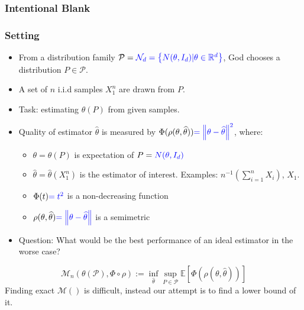 \documentclass[10pt,xcolor={usenames,dvipsnames,table},aspectratio=169]{beamer}
\begin{document}
\begin{frame}
    \frametitle{Intentional Blank}
\end{frame}

\begin{frame}
    \frametitle{Setting}
    \begin{itemize}
        \item From a distribution family $\mathcal{P} = {\color{blue} \mathcal{N}_d = \left\{N(\theta, I_d) | \theta \in \mathbb{R}^{d}\right\}}$, God chooses a distribution $P \in \mathcal{P}$.
        \item A set of $n$ i.i.d samples $X_1^{n}$ are drawn from  $P$.
        \item Task: estimating $\theta(P)$ from given samples. 
        \item Quality of estimator $\widehat{\theta}$ is measured by $\Phi(\rho(\theta, \widehat{\theta})) {\color{blue} = \left\lVert\theta - \widehat{\theta}\right\rVert^2}$, where:
            \begin{itemize}
                \item $\theta = \theta(P)$  is {\blue expectation} of $P = {\color{blue} N(\theta, I_d)}$
                \item  $\widehat{\theta} = \widehat{\theta}(X_1^{n})$ is the estimator of interest. Examples: $n^{-1}(\sum^{n}_{i=1} X_i )$, $X_1$.
                \item $\Phi(t)  {\color{blue} = t^2}$ is a non-decreasing function
                \item $\rho(\theta, \widehat{\theta}) {\color{blue} = \left\lVert\theta - \widehat{\theta}\right\rVert}$ is a semimetric
            \end{itemize}
        \item Question: What would be the best performance of an ideal estimator in the worse case?
    \end{itemize}
    \[
    \mathcal{M}_n(\theta(\mathcal{P}), \Phi \circ \rho) := \inf_{\widehat{\theta}} \sup_{P \in \mathcal{P}} \mathbb{E} \left[  \Phi(\rho(\theta, \widehat{\theta})) \right]
    \] 
    Finding exact $\mathcal{M}()$ is difficult, instead our attempt is to find a lower bound of it.
\end{frame}
\end{document}
